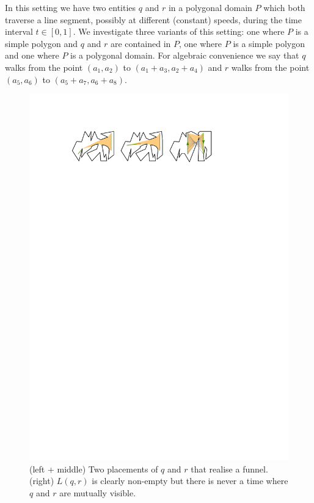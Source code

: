 \documentclass[UKenglish]{lipics-v2019}
\begin{document}
In this setting we have two entities $q$ and $r$ in a polygonal domain $P$ which both traverse a line segment, possibly at different (constant) speeds, during the time interval $t \in [0,1]$. We investigate three variants of this setting: one where $P$ is a simple polygon and $q$ and $r$ are contained in $P$, one where $P$ is a simple polygon and one where $P$ is a polygonal domain. For algebraic convenience we say that $q$ walks from the point $(a_1, a_2)$ to $(a_1 + a_3, a_2 + a_4)$ and $r$ walks from the point $(a_5, a_6)$ to $(a_5 + a_7, a_6 + a_8)$. 
\begin{figure}[t]
    \centering
    \includegraphics[]{../edgecase}
    \caption{(left + middle) Two placements of $q$ and $r$ that realise a funnel. (right) $L(q,r)$ is clearly non-empty but there is never a time where $q$ and $r$ are mutually visible. }
    \label{fig:edgecase}
\end{figure}
\end{document}

